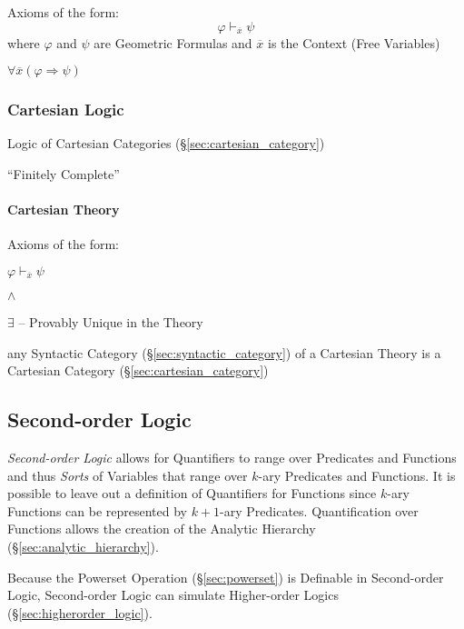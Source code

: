 Axioms of the form:
\[
  \varphi \vdash_{\overline{x}} \psi
\]
where $\varphi$ and $\psi$ are Geometric Formulas and $\overline{x}$
is the Context (Free Variables) %

$\forall \overline{x} (\varphi \Rightarrow \psi)$



\subsubsection{Cartesian Logic}\label{sec:cartesian_logic}

Logic of Cartesian Categories (\S\ref{sec:cartesian_category})

``Finitely Complete''



\paragraph{Cartesian Theory}\label{sec:cartesian_theory}\hfill

Axioms of the form:

$\varphi \vdash_{\overline{x}} \psi$

$\wedge$

$\exists$ -- Provably Unique in the Theory

any Syntactic Category (\S\ref{sec:syntactic_category}) of a Cartesian
Theory is a Cartesian Category (\S\ref{sec:cartesian_category})



\subsection{Second-order Logic}\label{sec:secondorder_logic}

\emph{Second-order Logic} allows for Quantifiers to range over
Predicates and Functions and thus \emph{Sorts} of Variables that range
over $k$-ary Predicates and Functions. It is possible to leave out a
definition of Quantifiers for Functions since $k$-ary Functions can be
represented by $k+1$-ary Predicates.\cite{shapiro00} Quantification
over Functions allows the creation of the Analytic Hierarchy
(\S\ref{sec:analytic_hierarchy}).

Because the Powerset Operation (\S\ref{sec:powerset}) is Definable in
Second-order Logic, Second-order Logic can simulate Higher-order
Logics (\S\ref{sec:higherorder_logic}).

